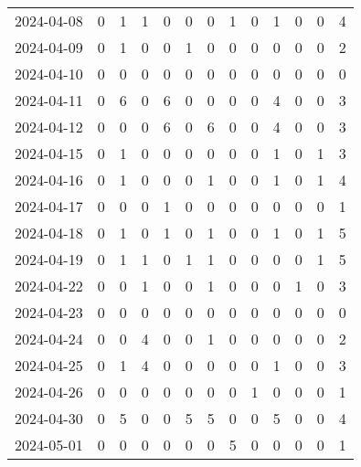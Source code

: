 \documentclass[dvipdfmx,oneside]{article}
\begin{document}
\begin{longtable}{lcccccccccccc}
        2024-04-08 &     0 &     1 &     1 &     0 &     0 &     0 &     1 &     0 &     1 &     0 &     0 &      4 \\
        2024-04-09 &     0 &     1 &     0 &     0 &     1 &     0 &     0 &     0 &     0 &     0 &     0 &      2 \\
        2024-04-10 &     0 &     0 &     0 &     0 &     0 &     0 &     0 &     0 &     0 &     0 &     0 &      0 \\
        2024-04-11 &     0 &     6 &     0 &     6 &     0 &     0 &     0 &     0 &     4 &     0 &     0 &      3 \\
        2024-04-12 &     0 &     0 &     0 &     6 &     0 &     6 &     0 &     0 &     4 &     0 &     0 &      3 \\
        2024-04-15 &     0 &     1 &     0 &     0 &     0 &     0 &     0 &     0 &     1 &     0 &     1 &      3 \\
        2024-04-16 &     0 &     1 &     0 &     0 &     0 &     1 &     0 &     0 &     1 &     0 &     1 &      4 \\
        2024-04-17 &     0 &     0 &     0 &     1 &     0 &     0 &     0 &     0 &     0 &     0 &     0 &      1 \\
        2024-04-18 &     0 &     1 &     0 &     1 &     0 &     1 &     0 &     0 &     1 &     0 &     1 &      5 \\
        2024-04-19 &     0 &     1 &     1 &     0 &     1 &     1 &     0 &     0 &     0 &     0 &     1 &      5 \\
        2024-04-22 &     0 &     0 &     1 &     0 &     0 &     1 &     0 &     0 &     0 &     1 &     0 &      3 \\
        2024-04-23 &     0 &     0 &     0 &     0 &     0 &     0 &     0 &     0 &     0 &     0 &     0 &      0 \\
        2024-04-24 &     0 &     0 &     4 &     0 &     0 &     1 &     0 &     0 &     0 &     0 &     0 &      2 \\
        2024-04-25 &     0 &     1 &     4 &     0 &     0 &     0 &     0 &     0 &     1 &     0 &     0 &      3 \\
        2024-04-26 &     0 &     0 &     0 &     0 &     0 &     0 &     0 &     1 &     0 &     0 &     0 &      1 \\
        2024-04-30 &     0 &     5 &     0 &     0 &     5 &     5 &     0 &     0 &     5 &     0 &     0 &      4 \\
        2024-05-01 &     0 &     0 &     0 &     0 &     0 &     0 &     5 &     0 &     0 &     0 &     0 &      1 \\

\end{longtable}
\end{document}
